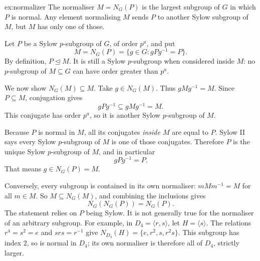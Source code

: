 \begin{solution}{ex:normalizer}
\idea The normaliser $M=N_G(P)$ is the largest subgroup of $G$ in which $P$ is normal. Any element normalising $M$ sends $P$ to another Sylow subgroup of $M$, but $M$ has only one of those.

\writeup Let $P$ be a Sylow $p$-subgroup of $G$, of order $p^a$, and put
\[
M=N_G(P)=\{g\in G:gPg^{-1}=P\}.
\]
By definition, $P\trianglelefteq M$. It is still a Sylow $p$-subgroup when considered inside $M$: no $p$-subgroup of $M\subseteq G$ can have order greater than $p^a$.

We now show $N_G(M)\subseteq M$. Take $g\in N_G(M)$. Thus $gMg^{-1}=M$. Since $P\subseteq M$, conjugation gives
\[
gPg^{-1}\subseteq gMg^{-1}=M.
\]
This conjugate has order $p^a$, so it is another Sylow $p$-subgroup of $M$.

Because $P$ is normal in $M$, all its conjugates \emph{inside $M$} are equal to $P$. Sylow II says every Sylow $p$-subgroup of $M$ is one of those conjugates. Therefore $P$ is the unique Sylow $p$-subgroup of $M$, and in particular
\[
gPg^{-1}=P.
\]
That means $g\in N_G(P)=M$.

Conversely, every subgroup is contained in its own normaliser: $mMm^{-1}=M$ for all $m\in M$. So $M\subseteq N_G(M)$, and combining the inclusions gives
\[
\boxed{N_G(N_G(P))=N_G(P)}.
\]
The statement relies on $P$ being Sylow. It is not generally true for the normaliser of an arbitrary subgroup.
For example, in $D_4=\langle r,s\rangle$, let $H=\langle s\rangle$.
The relations $r^4=s^2=e$ and $srs=r^{-1}$ give
$N_{D_4}(H)=\{e,r^2,s,r^2s\}$. This subgroup has index $2$, so is normal
in $D_4$; its own normaliser is therefore all of $D_4$, strictly larger.
\end{solution}

